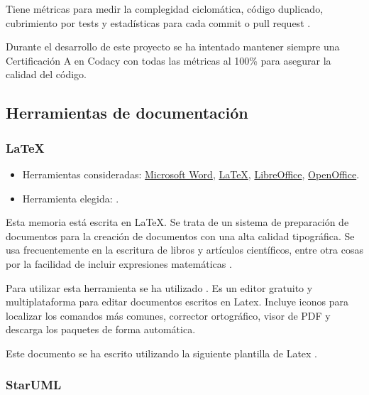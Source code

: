 Tiene métricas para medir la complegidad ciclomática, código duplicado, cubrimiento por tests y estadísticas para cada commit o pull request \cite{misc:codacygithub}.

Durante el desarrollo de este proyecto se ha intentado mantener siempre una Certificación A en Codacy con todas las métricas al 100\% para asegurar la calidad del código.


\subsection {Herramientas de documentación}

\subsubsection{LaTeX}

\begin{itemize}
	\tightlist
	\item
	Herramientas consideradas:
	\href{https://products.office.com/es-es/word}{Microsoft Word}, 
	\href{https://www.latex-project.org/}{LaTeX},
	\href{https://es.libreoffice.org/}{LibreOffice},
	\href{https://www.openoffice.org/es/}{OpenOffice}.
	\item
	Herramienta elegida:
	.
\end{itemize}

Esta memoria está escrita en \LaTeX. Se trata de un sistema de preparación de documentos para la creación de documentos con una alta calidad tipográfica. Se usa frecuentemente en la escritura de libros y artículos científicos, entre otra cosas por la facilidad de incluir expresiones matemáticas \cite{wiki:latex} \cite{wiki:latexwikibooks}.

Para utilizar esta herramienta se ha utilizado . Es un editor gratuito y multiplataforma para editar documentos escritos en Latex. Incluye iconos para localizar los comandos más comunes, corrector ortográfico, visor de PDF y descarga los paquetes de forma automática.

Este documento se ha escrito utilizando la siguiente plantilla de Latex \cite{misc:plantillalatex}.

\subsubsection{StarUML}

